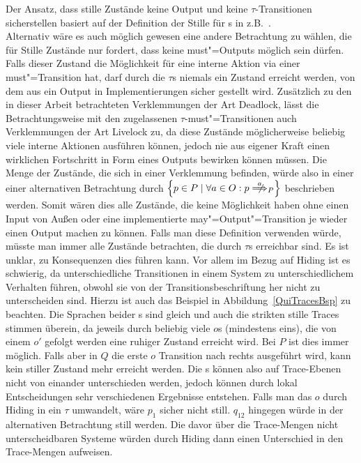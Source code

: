 Der Ansatz, dass stille Zustände keine Output und keine $\tau$-Transitionen
sicherstellen basiert auf der Definition der Stille für \EIO{}s in
z.B.~\cite{Schinko2016BA}.\\
Alternativ wäre es auch möglich gewesen eine andere Betrachtung zu wählen, die
für Stille Zustände nur fordert, dass keine must"=Outputs möglich sein dürfen.
Falls dieser Zustand die Möglichkeit für eine interne Aktion via einer
must"=Transition hat, darf durch die $\tau$s niemals ein Zustand erreicht
werden, von dem aus ein Output in Implementierungen sicher gestellt wird.
Zusätzlich zu den in dieser Arbeit betrachteten Verklemmungen der Art Deadlock,
lässt die Betrachtungsweise mit den zugelassenen $\tau$-must"=Transitionen auch
Verklemmungen der Art Livelock zu, da diese Zustände möglicherweise beliebig
viele interne Aktionen ausführen können, jedoch nie aus eigener Kraft einen
wirklichen Fortschritt in Form eines Outputs bewirken können müssen. Die Menge
der Zustände, die sich in einer Verklemmung befinden, würde also in einer
einer alternativen Betrachtung durch $\left\{p\in P\mid \forall a\in O:
p\nweakmust[a]_P \right\}$ beschrieben werden. Somit wären dies alle Zustände,
die keine Möglichkeit haben ohne einen Input von Außen oder eine implementierte
may"=Output"=Transition je wieder einen Output machen zu können. Falls man
diese Definition verwenden würde, müsste man immer alle Zustände betrachten,
die durch $\tau$s erreichbar sind. Es ist unklar, zu Konsequenzen dies führen
kann. Vor allem im Bezug auf Hiding ist es schwierig, da unterschiedliche
Transitionen in einem System zu unterschiedlichem Verhalten führen, obwohl sie
von der Transitionsbeschriftung her nicht zu unterscheiden sind. Hierzu ist
auch das Beispiel in Abbildung~\ref{QuiTracesBsp} zu beachten. Die Sprachen
beider \MEIO{}s sind gleich und auch die strikten stille Traces stimmen
überein, da jeweils durch beliebig viele $o$s (mindestens eins), die von einem
$o'$ gefolgt werden eine ruhiger Zustand erreicht wird. Bei $P$ ist dies immer
möglich. Falls aber in $Q$ die erste $o$ Transition nach rechts ausgeführt
wird, kann kein stiller Zustand mehr erreicht werden. Die \MEIO{}s können also
auf Trace-Ebenen nicht von einander unterschieden werden, jedoch können durch
lokal Entscheidungen sehr verschiedenen Ergebnisse entstehen. Falls man das $o$
durch Hiding in ein $\tau$ umwandelt, wäre $p_1$ sicher nicht still. $q_{12}$
hingegen würde in der alternativen Betrachtung still werden. Die davor über die
Trace-Mengen nicht unterscheidbaren Systeme würden durch Hiding dann einen
Unterschied in den Trace-Mengen aufweisen.

